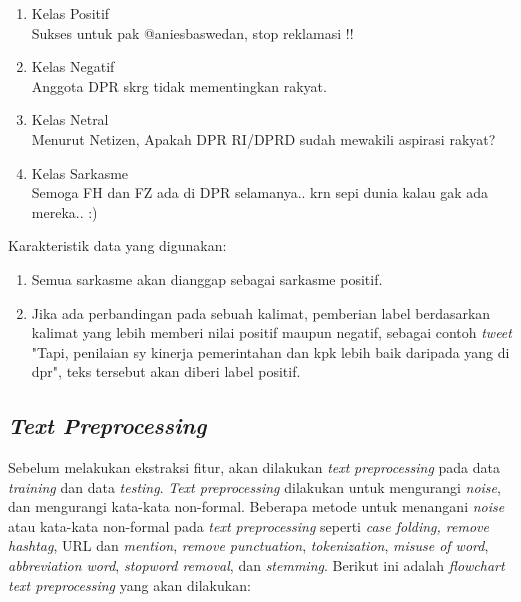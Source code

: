 \begin{enumerate}[leftmargin=*]
	\item Kelas Positif\\
	Sukses untuk pak @aniesbaswedan, stop reklamasi !!
	\item Kelas Negatif\\
	Anggota DPR skrg tidak mementingkan rakyat.
	\item Kelas Netral\\
	Menurut Netizen, Apakah DPR RI/DPRD sudah mewakili aspirasi rakyat?
	\item Kelas Sarkasme\\
	Semoga FH dan FZ ada di DPR selamanya.. krn sepi dunia kalau gak ada mereka.. :)
\end{enumerate}

\noindent Karakteristik data yang digunakan:
\begin{enumerate}[leftmargin=*]
	\item Semua sarkasme akan dianggap sebagai sarkasme positif.
	\item Jika ada perbandingan pada sebuah kalimat, pemberian label 
	berdasarkan kalimat yang lebih memberi nilai positif maupun negatif, 
	sebagai contoh \textit{tweet} "Tapi, penilaian sy kinerja 
	pemerintahan dan kpk lebih baik daripada yang di dpr", teks tersebut 
	akan diberi label positif.
\end{enumerate}
		
\subsection{\textit{Text Preprocessing}}
Sebelum melakukan ekstraksi fitur, akan dilakukan \textit{text} \textit{preprocessing }pada data \textit{training} dan data \textit{testing}. \textit{Text preprocessing }dilakukan untuk mengurangi \textit{noise}, dan mengurangi kata-kata non-formal. Beberapa metode untuk menangani \textit{noise} atau kata-kata non-formal pada \textit{text preprocessing }seperti \textit{case folding, remove hashtag}, URL dan \textit{mention}, \textit{remove punctuation}, \textit{tokenization}, \textit{misuse of word}, \textit{abbreviation word}, \textit{stopword removal}, dan \textit{stemming}. Berikut ini adalah \textit{flowchart text preprocessing} yang akan dilakukan:

